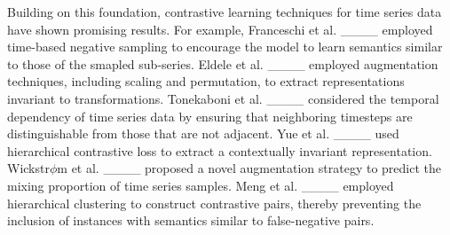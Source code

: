 Building on this foundation, contrastive learning techniques for time series data have shown promising results. For example, Franceschi et al. ____ employed time-based negative sampling to encourage the model to learn semantics similar to those of the smapled sub-series. Eldele et al. ____ employed augmentation techniques, including scaling and permutation, to extract representations invariant to transformations. Tonekaboni et al. ____ considered the temporal dependency of time series data by ensuring that neighboring timesteps are distinguishable from those that are not adjacent. Yue et al. ____ used hierarchical contrastive loss to extract a contextually invariant representation. Wickstr$\phi$m et al. ____ proposed a novel augmentation strategy to predict the mixing proportion of time series samples. Meng et al. ____ employed hierarchical clustering to construct contrastive pairs, thereby preventing the inclusion of instances with semantics similar to false-negative pairs.